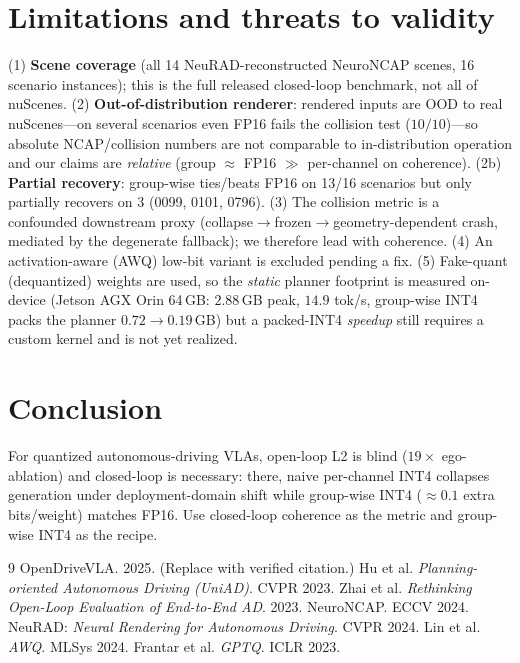 \documentclass[conference]{IEEEtran}
\begin{document}
\section{Limitations and threats to validity}
(1) \textbf{Scene coverage} (all 14 NeuRAD-reconstructed NeuroNCAP scenes, 16 scenario instances);
this is the full released closed-loop benchmark, not all of nuScenes. (2) \textbf{Out-of-distribution
renderer}: rendered inputs are OOD to real nuScenes---on several scenarios even FP16 fails the
collision test ($10/10$)---so absolute NCAP/collision numbers are not comparable to in-distribution
operation and our claims are \emph{relative} (group $\approx$ FP16 $\gg$ per-channel on coherence).
(2b) \textbf{Partial recovery}: group-wise ties/beats FP16 on 13/16 scenarios but only partially
recovers on 3 (0099, 0101, 0796). (3) The collision
metric is a confounded downstream proxy (collapse$\to$frozen$\to$geometry-dependent crash, mediated
by the degenerate fallback); we therefore lead with coherence. (4) An activation-aware (AWQ) low-bit
variant is excluded pending a fix. (5) Fake-quant (dequantized) weights are used, so the
\emph{static} planner footprint is measured on-device (Jetson AGX Orin 64\,GB: $2.88$\,GB peak,
$14.9$ tok/s, group-wise INT4 packs the planner $0.72\to 0.19$\,GB) but a packed-INT4 \emph{speedup}
still requires a custom kernel and is not yet realized.

\section{Conclusion}
For quantized autonomous-driving VLAs, open-loop L2 is blind ($19\times$ ego-ablation) and
closed-loop is necessary: there, naive per-channel INT4 collapses generation under deployment-domain
shift while group-wise INT4 ($\approx 0.1$ extra bits/weight) matches FP16. Use closed-loop
coherence as the metric and group-wise INT4 as the recipe.

\begin{thebibliography}{9}
 OpenDriveVLA. 2025. (Replace with verified citation.)
 Hu et al. \emph{Planning-oriented Autonomous Driving (UniAD)}. CVPR 2023.
 Zhai et al. \emph{Rethinking Open-Loop Evaluation of End-to-End AD}. 2023.
 NeuroNCAP. ECCV 2024.
 NeuRAD: \emph{Neural Rendering for Autonomous Driving}. CVPR 2024.
 Lin et al. \emph{AWQ}. MLSys 2024.
 Frantar et al. \emph{GPTQ}. ICLR 2023.
\end{thebibliography}
\end{document}
